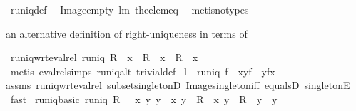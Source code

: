 \begin{isabellebody}
%
\isadelimproof
%
\endisadelimproof
%
\isatagproof
{}\isamarkupfalse%
\ runiq{\isacharunderscore}def\ \isamarkupfalse%
\ Image{\isacharunderscore}empty\ lm{}{}{}\ the{\isacharunderscore}elem{\isacharunderscore}eq\ \isamarkupfalse%
\ {\isacharparenleft}metis{\isacharparenleft}no{\isacharunderscore}types{\isacharparenright}{\isacharparenright}%
\endisatagproof
{\isafoldproof}%
%
\isadelimproof
%
\endisadelimproof
%
\begin{isamarkuptext}%
an alternative definition of right-uniqueness in terms of %
\end{isamarkuptext}%
\isamarkuptrue%
\isamarkupfalse%
\ runiq{\isacharunderscore}wrt{\isacharunderscore}eval{\isacharunderscore}rel{\isacharcolon}\ {\isachardoublequoteopen}runiq\ R\ {\isacharequal}\ {\isacharparenleft}{\isasymforall}x\ {\isachardot}\ R\ {\isacharbackquote}{\isacharbackquote}\ {\isacharbraceleft}x{\isacharbraceright}\ {\isasymsubseteq}\ {\isacharbraceleft}R\ {\isacharcomma}{\isacharcomma}\ x{\isacharbraceright}{\isacharparenright}{\isachardoublequoteclose}%
\isadelimproof
\ %
\endisadelimproof
%
\isatagproof
{}\isamarkupfalse%
\ {\isacharparenleft}metis\ eval{\isacharunderscore}rel{\isachardot}simps\ runiq{\isacharunderscore}alt\ trivial{\isacharunderscore}def{\isacharparenright}%
\endisatagproof
{\isafoldproof}%
%
\isadelimproof
%
\endisadelimproof
\isanewline
{}\isamarkupfalse%
\ l{}{}{\isacharcolon}\ \ {\isachardoublequoteopen}runiq\ f{\isachardoublequoteclose}\ \ {\isachardoublequoteopen}{\isacharparenleft}x{\isacharcomma}y{\isacharparenright}{\isasymin}f{\isachardoublequoteclose}\ \ {\isachardoublequoteopen}y{\isacharequal}f{\isacharcomma}{\isacharcomma}x{\isachardoublequoteclose}%
\isadelimproof
\ %
\endisadelimproof
%
\isatagproof
{}\isamarkupfalse%
\ \isanewline
assms\ runiq{\isacharunderscore}wrt{\isacharunderscore}eval{\isacharunderscore}rel\ subset{\isacharunderscore}singletonD\ Image{\isacharunderscore}singleton{\isacharunderscore}iff\ equals{}D\ singletonE\ \isamarkupfalse%
\ fast%
\endisatagproof
{\isafoldproof}%
%
\isadelimproof
%
\endisadelimproof
\isanewline
{}\isamarkupfalse%
\ runiq{\isacharunderscore}basic{\isacharcolon}\ {\isachardoublequoteopen}runiq\ R\ {\isasymlongleftrightarrow}\ {\isacharparenleft}{\isasymforall}\ x\ y\ y{\isacharprime}\ {\isachardot}\ {\isacharparenleft}x{\isacharcomma}\ y{\isacharparenright}\ {\isasymin}\ R\ {\isasymand}\ {\isacharparenleft}x{\isacharcomma}\ y{\isacharprime}{\isacharparenright}\ {\isasymin}\ R\ {\isasymlongrightarrow}\ y\ {\isacharequal}\ y{\isacharprime}{\isacharparenright}{\isachardoublequoteclose}\ \isanewline

\end{isabellebody}
